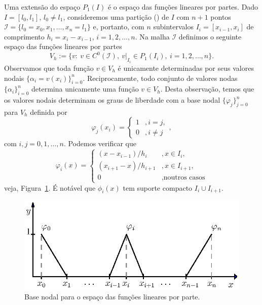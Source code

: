 Uma extensão do espaço $P_1(I)$ é o espaço das funções lineares por partes. Dado $I = [l_0, l_1]$, $l_0\neq l_1$, consideremos uma partição () de $I$ com $n+1$ pontos $\mathcal{I} = \{l_0=x_0, x_1, \dotsc, x_n=l_1\}$ e, portanto, com $n$ subintervalos $I_i=[x_{i-1}, x_{i}]$ de comprimento $h_i = x_i-x_{i-1}$, $i=1, 2, \dotsc, n$. Na malha $\mathcal{I}$ definimos o seguinte espaço das funções lineares por partes
\begin{equation}
  V_h := \{v:~v\in C^0(\mathcal{I}),~v|_{I_i}\in P_1(I_i),~i=1,2,\dotsc,n\}.
\end{equation}
Observamos que toda função $v\in V_h$ é unicamente determinadas por seus valores nodais $\{\alpha_i = v(x_i)\}_{i=0}^n$. Reciprocamente, todo conjunto de valores nodas $\{\alpha_i\}_{i=0}^n$ determina unicamente uma função $v\in V_h$. Desta observação, temos que os valores nodais determinam os graus de liberdade com a base nodal $\{\varphi_j\}_{j=0}^n$ para $V_h$ definida por
\begin{equation}
  \varphi_j(x_i) = \left\{
    \begin{array}{ll}
      1 &, i=j,\\
      0 &, i\neq j
    \end{array}
\right.,
\end{equation}
com $i,j=0,1,\dotsc,n$. Podemos verificar que
\begin{equation}
  \varphi_i(x) = \left\{
    \begin{array}{ll}
      (x-x_{i-1})/h_i &, x\in I_i,\\
      (x_{i+1}-x)/h_{i+1} &, x\in I_{i+1},\\
      0 &, \text{noutros casos}
    \end{array}
\right.
\end{equation}
veja, Figura~\ref{fig:baselinear}. É notável que $\phi_i(x)$ tem suporte compacto $I_i\cup I_{i+1}$.

\begin{figure}[h!]
  \centering
  \includegraphics[width=\textwidth]{./cap_mef1d/dados/fig_baselinear/fig_baselinear}
  \caption{Base nodal para o espaço das funções lineares por parte.}
  \label{fig:baselinear}
\end{figure}

